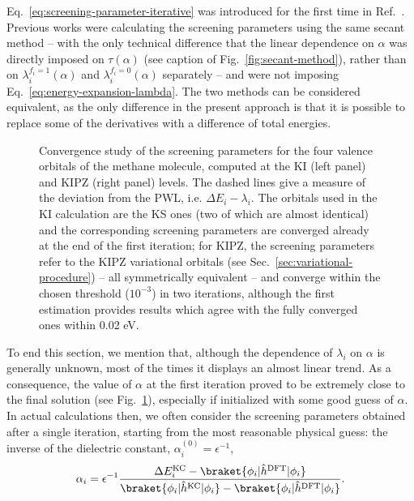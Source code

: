 Eq.~\eqref{eq:screening-parameter-iterative} was introduced for the first time in Ref.~\cite{nguyen_koopmans-compliant_2018}. Previous works were calculating the screening parameters using the same secant method -- with the only technical difference that the linear dependence on $\alpha$ was directly imposed on $\tau(\alpha)$ (see caption of Fig.~\ref{fig:secant-method}), rather than on $\lambda_i^{f_i=1}(\alpha)$ and $\lambda_i^{f_i=0}(\alpha)$ separately -- and were not imposing Eq.~\eqref{eq:energy-expansion-lambda}. The two methods can be considered equivalent, as the only difference in the present approach is that it is possible to replace some of the derivatives with a difference of total energies.

\begin{figure}
    \centering
     \qquad
    \caption[Convergence of screening parameters]{Convergence study of the screening parameters for the four valence orbitals of the methane molecule, computed at the KI (left panel) and KIPZ (right panel) levels. The dashed lines give a measure of the deviation from the PWL, i.e. $\Delta E_i - \lambda_i$. The orbitals used in the KI calculation are the KS ones (two of which are almost identical) and the corresponding screening parameters are converged already at the end of the first iteration; for KIPZ, the screening parameters refer to the KIPZ variational orbitals (see Sec.~\ref{sec:variational-procedure}) -- all symmetrically equivalent -- and converge within the chosen threshold ($10^{-3}$) in two iterations, although the first estimation provides results which agree with the fully converged ones within 0.02 eV.}
    \label{fig:alphas-convergence}
\end{figure}

To end this section, we mention that, although the dependence of $\lambda_i$ on $\alpha$ is generally unknown, most of the times it displays an almost linear trend. As a consequence, the value of $\alpha$ at the first iteration proved to be extremely close to the final solution (see Fig.~\ref{fig:alphas-convergence}), especially if initialized with some good guess of $\alpha$. In actual calculations then, we often consider the screening parameters obtained after a single iteration, starting from the most reasonable physical guess: the inverse of the dielectric constant, $\alpha_i^{(0)} = \epsilon^{-1}$,
%
\begin{equation}
    \alpha_i = \epsilon^{-1} \frac{\Delta E^{\rm KC}_i - \braket{\phi_i|\hat{h}^{\rm DFT}|\phi_i}}{\braket{\phi_i|\hat{h}^{\rm KC}|\phi_i} - \braket{\phi_i|\hat{h}^{\rm DFT}|\phi_i}} .
    \label{eq:screening-parameter-dscf}
\end{equation}


